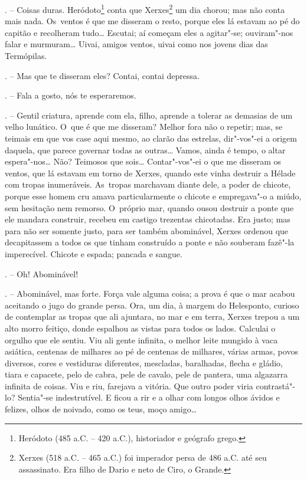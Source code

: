 \begin{Parskip}
. -- Coisas duras. Heródoto\footnote{Heródoto (485 a.C. --
  420 a.C.), historiador e geógrafo grego.} conta que Xerxes\footnote{Xerxes
   (518 a.C. -- 465 a.C.) foi imperador persa de 486 a.C. até seu
  assassinato. Era filho de Dario  e neto de Ciro, o Grande.} um dia
chorou; mas não conta mais nada. Os~ventos é que me disseram o resto,
porque eles lá estavam ao pé do capitão e recolheram tudo\ldots{} Escutai; aí
começam eles a agitar"-se; ouviram"-nos falar e murmuram\ldots{} Uivai, amigos
ventos, uivai como nos jovens dias das Termópilas.

. -- Mas que te disseram eles? Contai, contai depressa.

. -- Fala a gosto, nós te esperaremos.

. -- Gentil criatura, aprende com ela, filho, aprende a
tolerar as demasias de um velho lunático. O~que é que me disseram?
Melhor fora não o repetir; mas, se teimais em que vos case aqui mesmo,
ao clarão das estrelas, dir"-vos"-ei a origem daquela, que parece governar
todas as outras\ldots{} Vamos, ainda é tempo, o altar espera"-nos\ldots{} Não?
Teimosos que sois\ldots{} Contar"-vos"-ei o que me disseram os ventos, que lá
estavam em torno de Xerxes, quando este vinha destruir a Hélade com
tropas inumeráveis. As~tropas marchavam diante dele, a poder de chicote,
porque esse homem cru amava particularmente o chicote e empregava"-o a
miúdo, sem hesitação nem remorso. O~próprio mar, quando ousou destruir a
ponte que ele mandara construir, recebeu em castigo trezentas
chicotadas. Era justo; mas para não ser somente justo, para ser também
abominável, Xerxes ordenou que decapitassem a todos os que tinham
construído a ponte e não souberam fazê"-la imperecível. Chicote e espada;
pancada e sangue.

. -- Oh! Abominável!

. -- Abominável, mas forte. Força vale alguma coisa; a
prova é que o mar acabou aceitando o jugo do grande persa. Ora, um dia,
à margem do Helesponto, curioso de contemplar as tropas que ali
ajuntara, no mar e em terra, Xerxes trepou a um alto morro feitiço,
donde espalhou as vistas para todos os lados. Calculai o orgulho que ele
sentiu. Viu ali gente infinita, o melhor leite mungido à vaca asiática,
centenas de milhares ao pé de centenas de milhares, várias armas, povos
diversos, cores e vestiduras diferentes, mescladas, baralhadas, flecha e
gládio, tiara e capacete, pelo de cabra, pele de cavalo, pele de
pantera, uma algazarra infinita de coisas. Viu e riu, farejava a
vitória. Que outro poder viria contrastá"-lo? Sentia"-se indestrutível. E
ficou a rir e a olhar com longos olhos ávidos e felizes, olhos de
noivado, como os teus, moço amigo\ldots{}


\end{Parskip}

